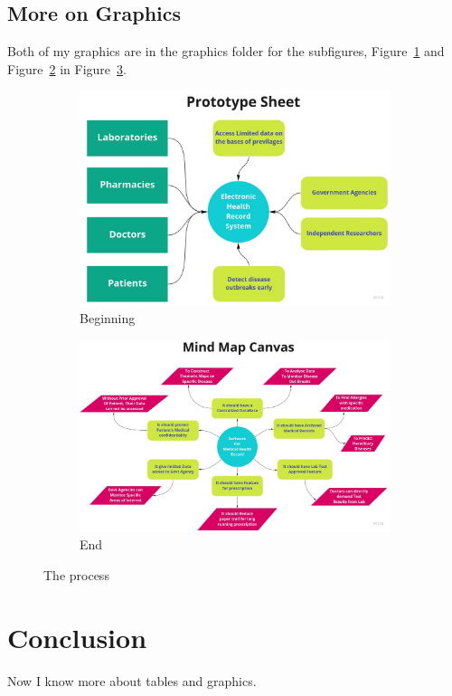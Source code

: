 \documentclass{proc}
\begin{document}
				\subsection{More on Graphics}
				Both of my graphics are in the graphics folder for the subfigures, Figure~\ref{fig:paper} and Figure~\ref{fig:page} in Figure~\ref{fig:subs}.			
			
							  \begin{figure}[htbp]
									\centering
										\begin{subfigure}[b]{0.2\textwidth}
													\centering
													\includegraphics[scale=0.05]{protoypeSheet.jpg}
													\caption{Beginning}
													\label{fig:paper}
										\end{subfigure}%
											\begin{subfigure}[b]{0.2\textwidth}
													\centering
													\includegraphics[scale=0.05]{MindMap2.jpg}
													\caption{End}
													\label{fig:page}
											\end{subfigure}%
												
									\caption{The process}
									\label{fig:subs}
								\end{figure}
 
				

\section{Conclusion}

 Now I know more about tables and graphics.
\end{document}
